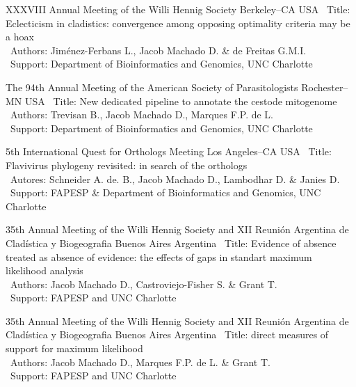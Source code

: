 \documentclass[11pt, letterpaper, sans]{moderncv}
\begin{document}
\vspace{.5em}

\cventry{---}
	{XXXVIII Annual Meeting of the Willi Hennig Society}
	{Berkeley--CA}
	{USA}
	{}
	{
		\textbullet~Title: Eclecticism in cladistics: convergence among opposing optimality criteria may be a hoax\\
		\textbullet~Authors: Jiménez-Ferbans L., Jacob Machado D. \& de Freitas G.M.I.\\ \textbullet~Support: Department of Bioinformatics and Genomics,  UNC Charlotte
	}

\vspace{.5em}

\cventry{---}
	{The 94th Annual Meeting of the American Society of Parasitologists}
	{Rochester--MN}
	{USA}
	{}
	{
		\textbullet~Title:  New dedicated pipeline to annotate the cestode mitogenome\\
		\textbullet~Authors: Trevisan B., Jacob Machado D., Marques F.P. de L.\\ \textbullet~Support: Department of Bioinformatics and Genomics,  UNC Charlotte
	}

\vspace{.5em}

	{5th International Quest for Orthologs Meeting}
	{Los Angeles--CA}
	{USA}
	{}
	{
		\textbullet~Title: Flavivirus phylogeny revisited: in search of the orthologs\\
		\textbullet~Autores: Schneider A. de. B., Jacob Machado D., Lambodhar D. \& Janies D.\\
		\textbullet~Support: FAPESP \& Department of Bioinformatics and Genomics,  UNC Charlotte
	}

\vspace{.5em}

	{35th Annual Meeting of the Willi Hennig Society and XII Reunión Argentina de Cladística y Biogeografia}
	{Buenos Aires}
	{Argentina}
	{}
	{
		\textbullet~Title: Evidence of absence treated as absence of evidence: the effects of gaps in standart maximum likelihood analysis\\
		\textbullet~Authors: Jacob Machado D., Castroviejo-Fisher S. \& Grant T.\\
		\textbullet~Support: FAPESP and UNC Charlotte
	}

\vspace{.5em}

\cventry{---}
	{35th Annual Meeting of the Willi Hennig Society and XII Reunión Argentina de Cladística y Biogeografia}
	{Buenos Aires}
	{Argentina}
	{}
	{
		\textbullet~Title: direct measures of support for maximum likelihood\\
		\textbullet~Authors: Jacob Machado D., Marques F.P. de L. \& Grant T.\\
		\textbullet~Support: FAPESP and UNC Charlotte
	}
\end{document}
